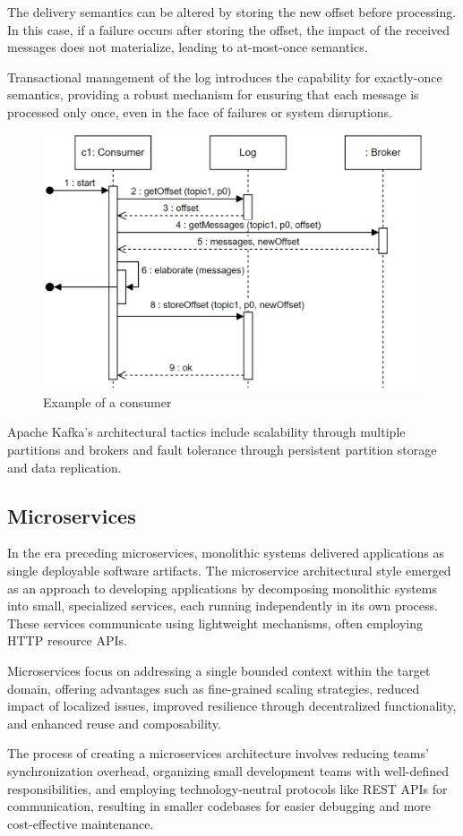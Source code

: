The delivery semantics can be altered by storing the new offset before processing. 
In this case, if a failure occurs after storing the offset, the impact of the received messages does not materialize, leading to at-most-once semantics.

Transactional management of the log introduces the capability for exactly-once semantics, providing a robust mechanism for ensuring that each message is processed only once, even in the face of failures or system disruptions.
\begin{figure}[H]
    \centering
    \includegraphics[width=0.75\linewidth]{images/consumer.png}
    \caption{Example of a consumer}
\end{figure}
Apache Kafka's architectural tactics include scalability through multiple partitions and brokers and fault tolerance through persistent partition storage and data replication.

\subsection*{Microservices}
In the era preceding microservices, monolithic systems delivered applications as single deployable software artifacts. 
The microservice architectural style emerged as an approach to developing applications by decomposing monolithic systems into small, specialized services, each running independently in its own process. 
These services communicate using lightweight mechanisms, often employing HTTP resource APIs.

Microservices focus on addressing a single bounded context within the target domain, offering advantages such as fine-grained scaling strategies, reduced impact of localized issues, improved resilience through decentralized functionality, and enhanced reuse and composability.

The process of creating a microservices architecture involves reducing teams' synchronization overhead, organizing small development teams with well-defined responsibilities, and employing technology-neutral protocols like REST APIs for communication, resulting in smaller codebases for easier debugging and more cost-effective maintenance.

